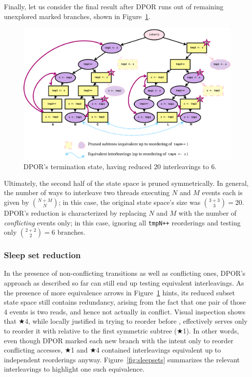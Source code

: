 Finally, let us consider the final result after DPOR runs out of remaining unexplored marked branches,
shown in Figure~\ref{fig:dpor-example-2}.

\begin{figure}[h]
	\begin{center}
		\includegraphics[width=\textwidth]{dpor-example-2.pdf}
	\end{center}
	\caption{DPOR's termination state, having reduced 20 interleavings to 6.}
	\label{fig:dpor-example-2}
\end{figure}

Ultimately, the second half of the state space is pruned symmetrically.
In general, the number of ways to interleave two threads executing $N$ and $M$ events each is given by ${N+M \choose N}$;
in this case, the original state space's size was ${3+3 \choose 3} = 20$.
DPOR's reduction is characterized by replacing $N$ and $M$ with the number of {\em conflicting} events only;
in this case, ignoring all {\tt tmpN++} reorderings and testing only ${2+2 \choose 2} = 6$ branches.

\subsubsection{Sleep set reduction}
\label{sec:landslide-sleepsets}

In the presence of non-conflicting transitions as well as conflicting ones,
DPOR's approach as described so far can still end up testing equivalent interleavings.
As the presence of more equivalence arrows in Figure~\ref{fig:dpor-example-2} hints,
its reduced subset state space still contains redundancy,
arising from the fact that one pair of those 4 events is two reads, and hence not actually in conflict.
Visual inspection shows that $\bigstar$4, while locally justified
in trying to reorder  before ,
effectively serves %
only to reorder it with 
relative to the first symmetric subtree ($\bigstar$1).
In other words,
even though DPOR marked each new branch with the intent only to reorder conflicting accesses,
$\bigstar$1 and $\bigstar$4 contained interleavings equivalent up to independent reorderings anyway.
Figure~\ref{fig:sleepsets} summarizes the relevant interleavings to highlight one such equivalence.

